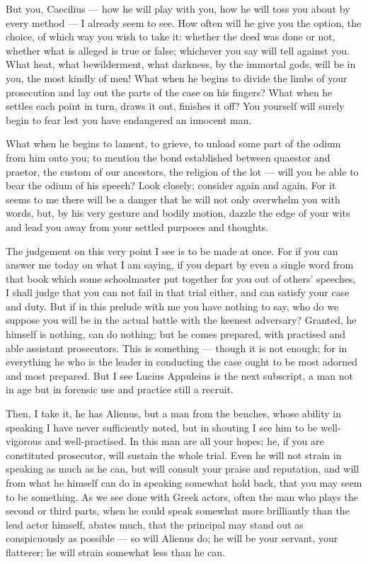 But you, Caecilius --- how he will play with you, how he will toss you about by every method --- I already seem to see. How often will he give you the option, the choice, of which way you wish to take it: whether the deed was done or not, whether what is alleged is true or false; whichever you say will tell against you. What heat, what bewilderment, what darkness, by the immortal gods, will be in you, the most kindly of men! What when he begins to divide the limbs of your prosecution and lay out the parts of the case on his fingers? What when he settles each point in turn, draws it out, finishes it off? You yourself will surely begin to fear lest you have endangered an innocent man.

 What when he begins to lament, to grieve, to unload some part of the odium from him onto you; to mention the bond established between quaestor and praetor, the custom of our ancestors, the religion of the lot --- will you be able to bear the odium of his speech? Look closely; consider again and again. For it seems to me there will be a danger that he will not only overwhelm you with words, but, by his very gesture and bodily motion, dazzle the edge of your wits and lead you away from your settled purposes and thoughts.

 The judgement on this very point I see is to be made at once. For if you can answer me today on what I am saying, if you depart by even a single word from that book which some schoolmaster put together for you out of others' speeches, I shall judge that you can not fail in that trial either, and can satisfy your case and duty. But if in this prelude with me you have nothing to say, who do we suppose you will be in the actual battle with the keenest adversary? Granted, he himself is nothing, can do nothing; but he comes prepared, with practised and able assistant prosecutors. This is something --- though it is not enough; for in everything he who is the leader in conducting the case ought to be most adorned and most prepared. But I see Lucius Appuleius is the next subscript, a man not in age but in forensic use and practice still a recruit.

 Then, I take it, he has Alienus, but a man from the benches, whose ability in speaking I have never sufficiently noted, but in shouting I see him to be well-vigorous and well-practised. In this man are all your hopes; he, if you are constituted prosecutor, will sustain the whole trial. Even he will not strain in speaking as much as he can, but will consult your praise and reputation, and will from what he himself can do in speaking somewhat hold back, that you may seem to be something. As we see done with Greek actors, often the man who plays the second or third parts, when he could speak somewhat more brilliantly than the lead actor himself, abates much, that the principal may stand out as conspicuously as possible --- so will Alienus do; he will be your servant, your flatterer; he will strain somewhat less than he can.

